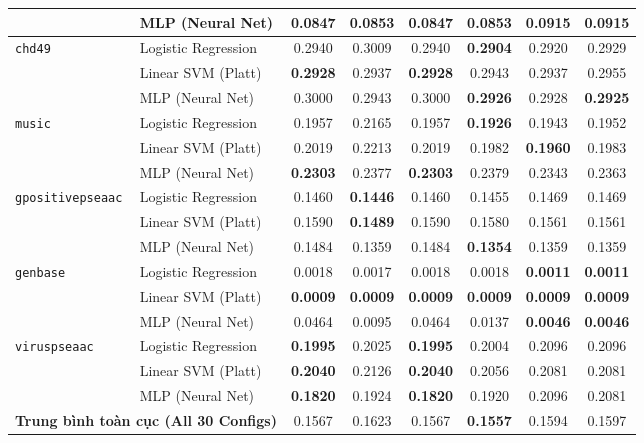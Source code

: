\documentclass[11pt,a4paper]{article}
\begin{document}
\begin{table}[H]
{\begin{tabular}{llcccccc}
 & MLP (Neural Net) & \textbf{0.0847} & 0.0853 & \textbf{0.0847} & 0.0853 & 0.0915 & 0.0915 \\
\midrule
\multirow{3}{*}{\texttt{chd49}} & Logistic Regression & 0.2940 & 0.3009 & 0.2940 & \textbf{0.2904} & 0.2920 & 0.2929 \\
 & Linear SVM (Platt) & \textbf{0.2928} & 0.2937 & \textbf{0.2928} & 0.2943 & 0.2937 & 0.2955 \\
 & MLP (Neural Net) & 0.3000 & 0.2943 & 0.3000 & \textbf{0.2926} & 0.2928 & \textbf{0.2925} \\
\midrule
\multirow{3}{*}{\texttt{music}} & Logistic Regression & 0.1957 & 0.2165 & 0.1957 & \textbf{0.1926} & 0.1943 & 0.1952 \\
 & Linear SVM (Platt) & 0.2019 & 0.2213 & 0.2019 & 0.1982 & \textbf{0.1960} & 0.1983 \\
 & MLP (Neural Net) & \textbf{0.2303} & 0.2377 & \textbf{0.2303} & 0.2379 & 0.2343 & 0.2363 \\
\midrule
\multirow{3}{*}{\texttt{gpositivepseaac}} & Logistic Regression & 0.1460 & \textbf{0.1446} & 0.1460 & 0.1455 & 0.1469 & 0.1469 \\
 & Linear SVM (Platt) & 0.1590 & \textbf{0.1489} & 0.1590 & 0.1580 & 0.1561 & 0.1561 \\
 & MLP (Neural Net) & 0.1484 & 0.1359 & 0.1484 & \textbf{0.1354} & 0.1359 & 0.1359 \\
\midrule
\multirow{3}{*}{\texttt{genbase}} & Logistic Regression & 0.0018 & 0.0017 & 0.0018 & 0.0018 & \textbf{0.0011} & \textbf{0.0011} \\
 & Linear SVM (Platt) & \textbf{0.0009} & \textbf{0.0009} & \textbf{0.0009} & \textbf{0.0009} & \textbf{0.0009} & \textbf{0.0009} \\
 & MLP (Neural Net) & 0.0464 & 0.0095 & 0.0464 & 0.0137 & \textbf{0.0046} & \textbf{0.0046} \\
\midrule
\multirow{3}{*}{\texttt{viruspseaac}} & Logistic Regression & \textbf{0.1995} & 0.2025 & \textbf{0.1995} & 0.2004 & 0.2096 & 0.2096 \\
 & Linear SVM (Platt) & \textbf{0.2040} & 0.2126 & \textbf{0.2040} & 0.2056 & 0.2081 & 0.2081 \\
 & MLP (Neural Net) & \textbf{0.1820} & 0.1924 & \textbf{0.1820} & 0.1920 & 0.2096 & 0.2081 \\
\midrule
\multicolumn{2}{l}{\textbf{Trung bình toàn cục (All 30 Configs)}} & 0.1567 & 0.1623 & 0.1567 & \textbf{0.1557} & 0.1594 & 0.1597 \\
\bottomrule
\end{tabular}%
}
\end{table}
\end{document}
